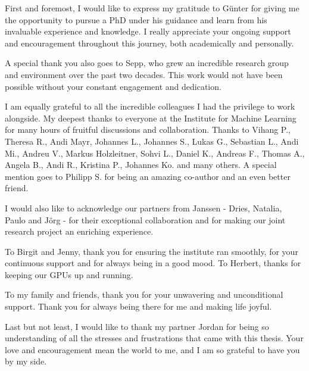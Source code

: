%

First and foremost, I would like to express my gratitude to Günter for giving me the opportunity to pursue a PhD under his guidance
and learn from his invaluable experience and knowledge. I really appreciate your ongoing support and encouragement
throughout this journey, both academically and personally. 

A special thank you also goes to Sepp, who grew an incredible research group and environment over the past two decades.
This work would not have been possible without your constant engagement and dedication. 

I am equally grateful to all the incredible colleagues I had the privilege to work alongside. My deepest thanks to
everyone at the Institute for Machine Learning for many hours of fruitful discussions and collaboration. Thanks to
Vihang P., Theresa R., Andi Mayr, Johannes L., Johannes S., Lukas G., Sebastian L., Andi Mi., Andreu V., Markus Holzleitner, Sohvi L.,
Daniel K., Andreas F., Thomas A., Angela B., Andi R., Kristina P., Johannes Ko. and many others. A special mention goes to
Philipp S. for being an amazing co-author and an even better friend.

I would also like to acknowledge our partners from Janssen - Dries, Natalia, Paulo and Jörg - for their exceptional
collaboration and for making our joint research project an enriching experience.

To Birgit and Jenny, thank you for ensuring the institute ran smoothly, for your continuous support and 
for always being in a good mood. To Herbert, thanks for keeping our GPUs up and running.

To my family and friends, thank you for your unwavering and unconditional support. Thank you for always being there for
me and making life joyful.

Last but not least, I would like to thank my partner Jordan for being so understanding of all the stresses and
frustrations that came with this thesis. Your love and encouragement mean the world to me, and I am so grateful to have
you by my side.